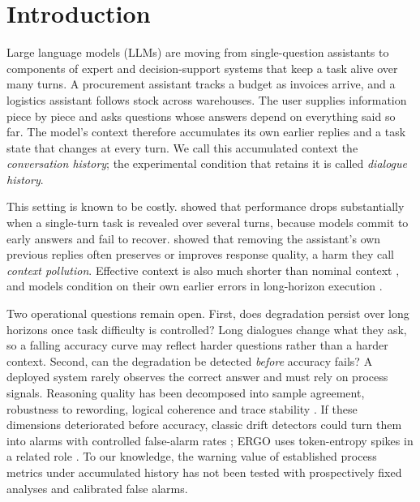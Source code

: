 \section{Introduction}
\label{sec:introduction}

Large language models (LLMs) are moving from single-question assistants to
components of expert and decision-support systems that keep a task alive over
many turns. A procurement assistant tracks a budget as invoices arrive, and a
logistics assistant follows stock across warehouses. The user supplies
information piece by piece and asks questions whose answers depend on
everything said so far. The model's context therefore accumulates its own
earlier replies and a task state that changes at every turn. We call this
accumulated context the \emph{conversation history}; the experimental
condition that retains it is called \emph{dialogue history}.

This setting is known to be costly. \citet{laban2025lost} showed that
performance drops substantially when a single-turn task is revealed over
several turns, because models commit to early answers and fail to recover.
\citet{huang2026benefit} showed that removing the assistant's own previous
replies often preserves or improves response quality, a harm they call
\emph{context pollution}. Effective context is also much shorter than nominal
context \citep{liu2024lost,hsieh2024ruler}, and models condition on their own
earlier errors in long-horizon execution \citep{sinha2025illusion}.

Two operational questions remain open. First, does degradation persist over
long horizons once task difficulty is controlled? Long dialogues change what
they ask, so a falling accuracy curve may reflect harder questions rather than
a harder context. Second, can the degradation be detected \emph{before}
accuracy fails? A deployed system rarely observes the correct answer and must
rely on process signals. Reasoning quality has been decomposed into sample
agreement, robustness to rewording, logical coherence and trace stability
\citep{rqeval2026}. If these dimensions deteriorated before accuracy, classic
drift detectors could turn them into alarms with controlled false-alarm rates
\citep{gama2014survey,lu2019learning}; ERGO uses token-entropy spikes in a
related role \citep{khalid2025ergo}. To our knowledge, the warning value of
established process metrics under accumulated history has not been tested with
prospectively fixed analyses and calibrated false alarms.

